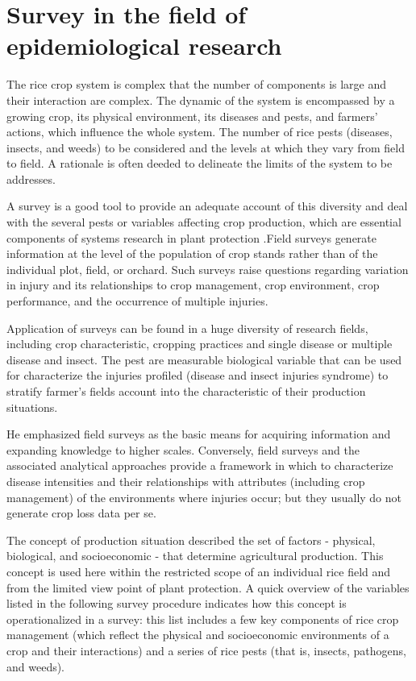 \section*{Survey in the field of epidemiological research}
The rice crop system is complex that the number of components is large and their interaction are complex. The dynamic of the system is encompassed by a growing crop, its physical environment, its diseases and pests, and farmers’ actions, which influence the whole system. The number of rice pests (diseases, insects, and weeds) to be considered and the levels at which they vary from field to field. A rationale is often deeded to delineate the limits of the system to be addresses.

A survey is a good tool to provide an adequate account of this diversity and deal with the several pests or variables affecting crop production, which are essential components of systems research in plant protection \citet{Zadoks:1979ts}.Field surveys generate information at the level of the population of crop stands rather than of the individual plot, field, or orchard. Such surveys raise questions regarding variation in injury and its relationships to crop management, crop environment, crop performance, and the occurrence of multiple injuries.

Application of surveys can be found in a huge diversity of research fields, including crop characteristic, cropping practices and single disease or multiple disease and insect. The pest are measurable biological variable that can be used for characterize the injuries profiled (disease and insect injuries syndrome) to stratify farmer’s fields account into the characteristic of their production situations.

He emphasized field surveys as the basic means for acquiring information and expanding knowledge to higher scales. Conversely, field surveys and the associated analytical approaches provide a framework in which to characterize disease intensities and their relationships with attributes (including crop management) of the environments where injuries occur; but they usually do not generate crop loss data per se.

The concept of production situation described the set of factors - physical, biological, and socioeconomic - that determine agricultural production. This concept is used here within the restricted scope of an individual rice field and from the limited view point of plant protection. A quick overview of the variables listed in the following survey procedure indicates how this concept is operationalized in a survey: this list includes a few key components of rice crop management (which reflect the physical and socioeconomic environments of a crop and their interactions) and a series of rice pests (that is, insects, pathogens, and weeds).

